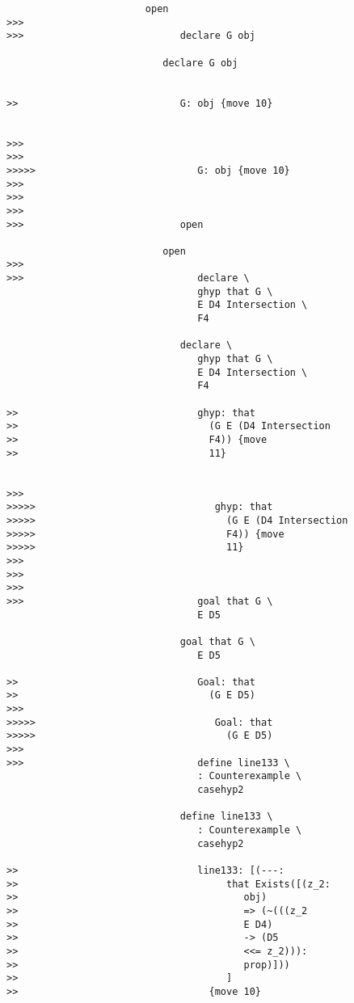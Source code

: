 \documentclass[12pt]{article}
\begin{document}
\begin{verbatim}
                        open
>>>
>>>                           declare G obj

                           declare G obj


>>                            G: obj {move 10}


>>>
>>>
>>>>>                            G: obj {move 10}
>>>
>>>
>>>
>>>                           open

                           open
>>>
>>>                              declare \
                                 ghyp that G \
                                 E D4 Intersection \
                                 F4

                              declare \
                                 ghyp that G \
                                 E D4 Intersection \
                                 F4

>>                               ghyp: that
>>                                 (G E (D4 Intersection
>>                                 F4)) {move
>>                                 11}


>>>
>>>>>                               ghyp: that
>>>>>                                 (G E (D4 Intersection
>>>>>                                 F4)) {move
>>>>>                                 11}
>>>
>>>
>>>
>>>                              goal that G \
                                 E D5

                              goal that G \
                                 E D5

>>                               Goal: that
>>                                 (G E D5)
>>>
>>>>>                               Goal: that
>>>>>                                 (G E D5)
>>>
>>>                              define line133 \
                                 : Counterexample \
                                 casehyp2

                              define line133 \
                                 : Counterexample \
                                 casehyp2

>>                               line133: [(---:
>>                                    that Exists([(z_2:
>>                                       obj)
>>                                       => (~(((z_2
>>                                       E D4)
>>                                       -> (D5
>>                                       <<= z_2))):
>>                                       prop)]))
>>                                    ]
>>                                 {move 10}



\end{verbatim}
\end{document}
